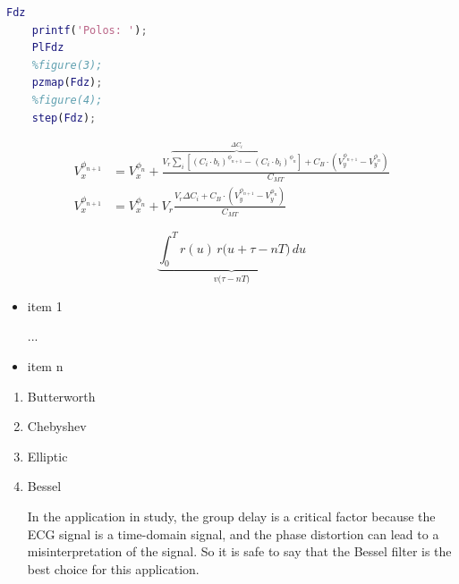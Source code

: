 \begin{lstlisting}[language=Matlab, caption=Matlab code example]
    Fdz
    printf('Polos: ');
    PlFdz
    %figure(3);
    pzmap(Fdz);
    %figure(4);
    step(Fdz);
\end{lstlisting}

\begin{equation}
    \begin{split}
        V_x^{\phi_{n+1}} &= V_x^{\phi_{n}} +  \frac{ V_r\overbrace{\sum_{i}\left[ (C_i\cdot b_i)^{\phi_{n+1}} - (C_i\cdot b_i)^{\phi_{n}}\right]}^{\Delta C_i}+C_B\cdot \left(V_y^{\phi_{n+1}}-V_y^{\phi_{n}}\right)}{C_{MT}} \\
        V_x^{\phi_{n+1}} &= V_x^{\phi_{n}} + V_r \frac{ V_r \Delta C_i +C_B\cdot \left(V_y^{\phi_{n+1}}-V_y^{\phi_{n}}\right)}{C_{MT}}
    \end{split}
    \label{eq:VxPn}
\end{equation}

\begin{equation}
    \boxed{\underbrace{\int_{0}^{T}r(u)\,r\bigl(u+\tau - nT\bigr)\,du}_{v\bigl(\tau - nT\bigr)}}
\end{equation}

\begin{itemize}
    \item item 1
    
    ...
    \item item n 
\end{itemize}

\begin{enumerate}
    \item Butterworth

    \item Chebyshev
    
    \item Elliptic
    
    \item Bessel
    
    In the application in study, the group delay is a critical factor because the ECG signal is a time-domain signal, and the phase distortion can lead to a misinterpretation of the signal. So it is safe to say that the Bessel filter is the best choice for this application.
\end{enumerate}

